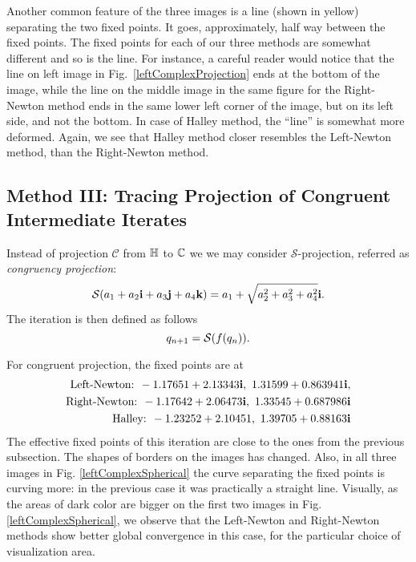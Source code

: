 \documentclass{article}
\theoremstyle{definition}
\def\Cal{\mathcal}
\begin{document}
Another common feature of the three images is a line (shown in yellow) separating the two fixed points. It goes, approximately, half way between the fixed points. The fixed points for each of our three methods are somewhat different and so is the line. For instance, a careful reader would notice that the line on left image in Fig.~\ref{leftComplexProjection} ends at the bottom of the image, while the line on the middle image in the same figure for the Right-Newton method ends in the same lower left corner of the image, but on its left side, and not the bottom. In case of Halley method, the ``line'' is somewhat more deformed. Again, we see that Halley method closer resembles the Left-Newton method, than the Right-Newton method.


\subsection{Method III: Tracing Projection of Congruent Intermediate Iterates}

Instead of projection $\Cal C$ from ${\mathbb H}$ to ${\mathbb C}$ we
we may consider $\Cal S$-projection, referred as {\it congruency projection}:
\begin{equation}
\Cal S(a_1+a_2 {\bf i} +a_3{\bf j}+a_4 {\bf k})= a_1+\sqrt{a_2^2+a_3^2+a_4^2} {\bf i}.
\end{equation}
The iteration is then defined as follows
\begin{equation}
q_{n+1}={\cal S}(f(q_n)).
\end{equation}


For congruent projection, the fixed points are at
\begin{eqnarray*}
\mbox{Left-Newton: } -1.17651+ 2.13343{\bf i},\ 1.31599+ 0.863941{\bf i},\\
\mbox{Right-Newton: }-1.17642+ 2.06473 {\bf i},\ 1.33545+ 0.687986{\bf i}\\
\mbox{Halley: }-1.23252+2.10451,\ 1.39705+ 0.88163 {\bf i}
\end{eqnarray*}
The effective fixed points of this iteration are close to the ones from the previous subsection. The shapes of borders on the images has changed. Also, in all three images in  Fig. \ref{leftComplexSpherical}  the curve separating the fixed points is curving more: in the previous case it was practically a straight line. Visually, as the areas of dark color are bigger on the first two images in Fig. \ref{leftComplexSpherical}, we observe that the Left-Newton and Right-Newton methods show better global convergence in this case, for the particular choice of visualization area.
\end{document}
